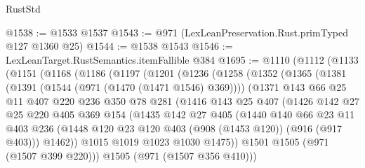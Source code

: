 \begin{lexlean}{RustStd}
\begin{coremodule}
@1538 := @1533 @1537
@1543 := @971 (LexLeanPreservation.Rust.primTyped @127 @1360 @25)
@1544 := @1538 @1543
@1546 := LexLeanTarget.RustSemantics.itemFallible @384
@1695 := @1110
    (@1112
      (@1133
        (@1151
          (@1168
            (@1186
              (@1197
                (@1201
                  (@1236
                    (@1258
                      (@1352
                        (@1365
                          (@1381
                            (@1391 (@1544 (@971 (@1470 (@1471 @1546) @369))))
                            (@1371
                              @143
                              @66
                              @25
                              @11
                              @407
                              @220
                              @236
                              @350
                              @78
                              @281
                              (@1416
                                @143
                                @25
                                @407
                                (@1426
                                  @142
                                  @27
                                  @25
                                  @220
                                  @405
                                  @369
                                  @154
                                  (@1435
                                    @142
                                    @27
                                    @405
                                    (@1440
                                      @140
                                      @66
                                      @23
                                      @11
                                      @403
                                      @236
                                      (@1448
                                        @120
                                        @23
                                        @120
                                        @403
                                        (@908 (@1453 @120))
                                        (@916 (@917 @403)))
                                      @1462))
                                  @1015
                                  @1019
                                  @1023
                                  @1030
                                  @1475))
                              @1501
                              @1505
                              (@971 (@1507 @399 @220)))
                            @1505
                            (@971 (@1507 @356 @410)))

\end{coremodule}
\end{lexlean}

